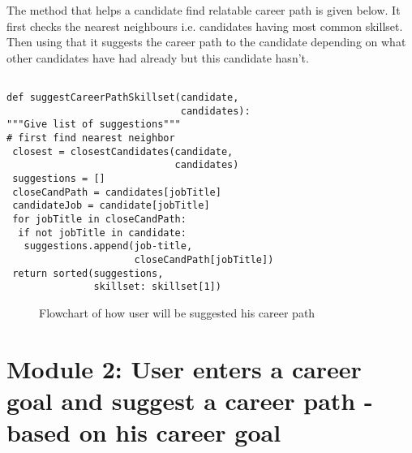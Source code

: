 \documentclass[conference]{IEEEtran}
\begin{document}
The method that helps a candidate find relatable career path is given below. It first checks the nearest neighbours i.e. candidates having most common skillset. Then using that it suggests the career path to the candidate depending on what other candidates have had already but this candidate hasn't. 
\begin{lstlisting}

def suggestCareerPathSkillset(candidate, 
                              candidates):
"""Give list of suggestions"""
# first find nearest neighbor
 closest = closestCandidates(candidate,
                             candidates)
 suggestions = []
 closeCandPath = candidates[jobTitle]
 candidateJob = candidate[jobTitle]
 for jobTitle in closeCandPath:
  if not jobTitle in candidate:
   suggestions.append(job-title,
                      closeCandPath[jobTitle])
 return sorted(suggestions, 
               skillset: skillset[1])

\end{lstlisting}

  \begin{figure}[!htb]
    \centering
    \caption{Flowchart of how user will be suggested his career path}
    \label{fig:datafusionindirectdirectfc}
  \end{figure}

\section{Module 2: User enters a career goal and suggest a career path - based on his career goal}
\end{document}
